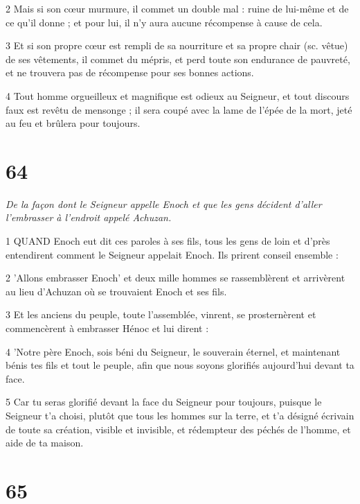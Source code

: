 \par 2 Mais si son cœur murmure, il commet un double mal : ruine de lui-même et de ce qu'il donne ; et pour lui, il n'y aura aucune récompense à cause de cela.

\par 3 Et si son propre cœur est rempli de sa nourriture et sa propre chair (sc. vêtue) de ses vêtements, il commet du mépris, et perd toute son endurance de pauvreté, et ne trouvera pas de récompense pour ses bonnes actions.

\par 4 Tout homme orgueilleux et magnifique est odieux au Seigneur, et tout discours faux est revêtu de mensonge ; il sera coupé avec la lame de l'épée de la mort, jeté au feu et brûlera pour toujours.

\chapter{64}

\par \textit{De la façon dont le Seigneur appelle Enoch et que les gens décident d'aller l'embrasser à l'endroit appelé Achuzan.}

\par 1 QUAND Enoch eut dit ces paroles à ses fils, tous les gens de loin et d'près entendirent comment le Seigneur appelait Enoch. Ils prirent conseil ensemble :

\par 2 'Allons embrasser Enoch' et deux mille hommes se rassemblèrent et arrivèrent au lieu d'Achuzan où se trouvaient Enoch et ses fils.

\par 3 Et les anciens du peuple, toute l'assemblée, vinrent, se prosternèrent et commencèrent à embrasser Hénoc et lui dirent :

\par 4 'Notre père Enoch, sois béni du Seigneur, le souverain éternel, et maintenant bénis tes fils et tout le peuple, afin que nous soyons glorifiés aujourd'hui devant ta face.

\par 5 Car tu seras glorifié devant la face du Seigneur pour toujours, puisque le Seigneur t'a choisi, plutôt que tous les hommes sur la terre, et t'a désigné écrivain de toute sa création, visible et invisible, et rédempteur des péchés de l'homme, et aide de ta maison.

\chapter{65}

